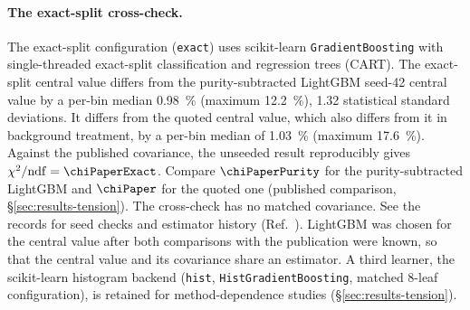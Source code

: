 \paragraph{The exact-split cross-check.} The exact-split configuration (\texttt{exact}) uses scikit-learn \texttt{GradientBoosting} with single-threaded exact-split classification and regression trees (CART). The exact-split central value differs from the purity-subtracted LightGBM seed-42 central value by a per-bin median \SI{0.98}{\percent} (maximum \SI{12.2}{\percent}), 1.32 statistical standard deviations. It differs from the quoted central value, which also differs from it in background treatment, by a per-bin median of \SI{1.03}{\percent} (maximum \SI{17.6}{\percent}). Against the published covariance, the unseeded result reproducibly gives $\chi^{2}/\mathrm{ndf}=\chiPaperExact$. Compare $\chiPaperPurity$ for the purity-subtracted LightGBM and $\chiPaper$ for the quoted one (published comparison, \S\ref{sec:results-tension}). The cross-check has no matched covariance. See the records for seed checks and estimator history (Ref.~\cite{NoteRecords2026}). LightGBM was chosen for the central value after both comparisons with the publication were known, so that the central value and its covariance share an estimator. A third learner, the scikit-learn histogram backend (\texttt{hist}, \texttt{HistGradientBoosting}, matched 8-leaf configuration), is retained for method-dependence studies (\S\ref{sec:results-tension}).

